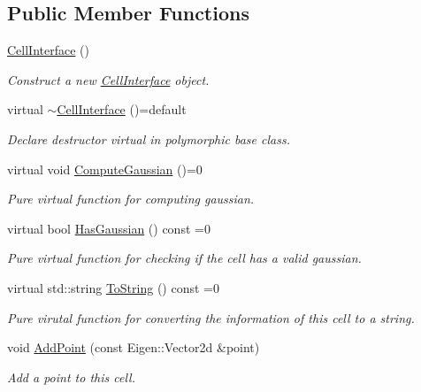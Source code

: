 \subsection*{Public Member Functions}
\begin{DoxyCompactItemize}
\item 
\hyperlink{classCellInterface_a9b6475eb2be5f4d13eec0f5057e6318a}{Cell\+Interface} ()
\begin{DoxyCompactList}\small\item\em Construct a new \hyperlink{classCellInterface}{Cell\+Interface} object. \end{DoxyCompactList}\item 
virtual \hyperlink{classCellInterface_abf06540d5ecb1d834f512fcf8f10e1fd}{$\sim$\+Cell\+Interface} ()=default
\begin{DoxyCompactList}\small\item\em Declare destructor virtual in polymorphic base class. \end{DoxyCompactList}\item 
virtual void \hyperlink{classCellInterface_a77bb8db9ba84ecb98622b18d70854090}{Compute\+Gaussian} ()=0
\begin{DoxyCompactList}\small\item\em Pure virtual function for computing gaussian. \end{DoxyCompactList}\item 
virtual bool \hyperlink{classCellInterface_a4fde95ddb0950dc41ee77dfdeb90928b}{Has\+Gaussian} () const =0
\begin{DoxyCompactList}\small\item\em Pure virtual function for checking if the cell has a valid gaussian. \end{DoxyCompactList}\item 
virtual std\+::string \hyperlink{classCellInterface_aaf0e64422724ac733741783a4323a4c2}{To\+String} () const =0
\begin{DoxyCompactList}\small\item\em Pure virutal function for converting the information of this cell to a string. \end{DoxyCompactList}\item 
void \hyperlink{classCellInterface_a23d86344bc3de7febd8a5dcae41562d6}{Add\+Point} (const Eigen\+::\+Vector2d \&point)
\begin{DoxyCompactList}\small\item\em Add a point to this cell. \end{DoxyCompactList}\item 

\end{DoxyCompactItemize}
